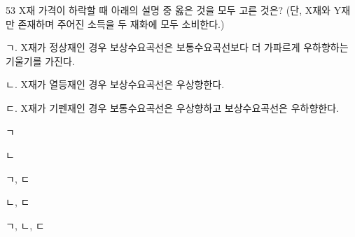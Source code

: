 \begin{question}{53}
X재 가격이 하락할 때 아래의 설명 중 옳은 것을 모두 고른 것은? (단, X재와 Y재만 존재하며 주어진 소득을 두 재화에 모두 소비한다.)
\begin{framedtext}
ㄱ. X재가 정상재인 경우 보상수요곡선은 보통수요곡선보다 더 가파르게 우하향하는 기울기를 가진다. \par
ㄴ. X재가 열등재인 경우 보상수요곡선은 우상향한다. \par
ㄷ. X재가 기펜재인 경우 보통수요곡선은 우상향하고 보상수요곡선은 우하향한다.
\end{framedtext}
\begin{choices}
  \item ㄱ
  \item ㄴ
  \item ㄱ, ㄷ
  \item ㄴ, ㄷ
  \item ㄱ, ㄴ, ㄷ
\end{choices}
\end{question}
